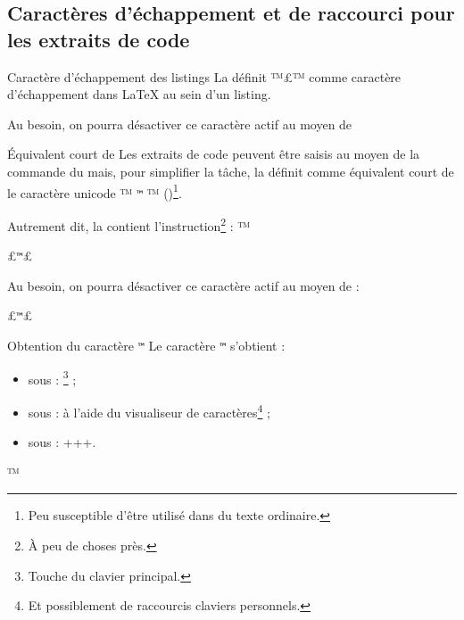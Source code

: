 \documentclass{letgut}
\begin{document}
\subsection{Caractères d'échappement et de raccourci pour les
  extraits de code}
\label{sec:caract-dech-et}

\begin{dbwarning}{Caractère d'échappement des listings}{}
  \lstset{escapechar=}%
  La  définit ™£™ comme caractère d'échappement dans \LaTeX{} au
  sein d'un listing.
\end{dbwarning}

Au besoin, on pourra désactiver ce caractère actif au moyen de
\begin{ltx-code}
\lstset{escapechar=}
\end{ltx-code}

\begin{dbwarning}{Équivalent court de }{}
  Les extraits de code peuvent être saisis au moyen de la commande
   du  mais, pour
  simplifier la tâche, la  définit comme équivalent court
  de  le caractère unicode %
  \lstDeleteShortInline™%
  \texttt{™} %
  \lstMakeShortInline™%
  ()\footnote{Peu susceptible d'être utilisé dans du texte
    ordinaire.}.
\end{dbwarning}

Autrement dit, la  contient l'instruction\footnote{À peu
  de choses près.} :
  \lstDeleteShortInline™
\begin{ltx-code}
\lstMakeShortInline£\texttt{™}£
\end{ltx-code}

  Au besoin, on pourra désactiver ce caractère actif au moyen de :
\begin{ltx-code}
\lstDeleteShortInline£\texttt{™}£
\end{ltx-code}

\begin{dbremark}{Obtention du caractère \texttt{™}}{}
Le caractère %
\texttt{™} %
s'obtient :
\begin{itemize}
\item sous \linux{} : \footnote{Touche  du clavier
    principal.} ;
\item sous \macos{} : à l'aide du visualiseur de caractères\footnote{Et
    possiblement de raccourcis claviers personnels.} ;
\item sous \windows{} : +++.
\end{itemize}
\end{dbremark}
  \lstMakeShortInline™%
\end{document}
